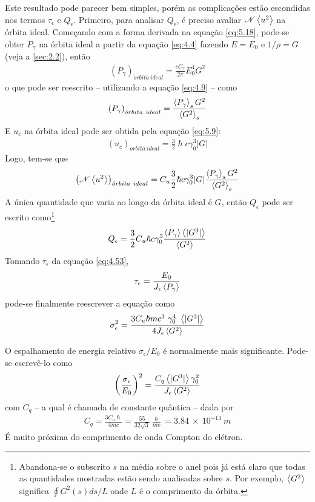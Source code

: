 Este resultado pode parecer bem simples, porém as complicações estão escondidas nos termos $\tau_\epsilon$ e $Q_\epsilon$. Primeiro, para analisar $Q_\epsilon$, é preciso avaliar $\mathscr{N}\left< u^2 \right>$ na órbita ideal. Começando com a forma derivada na equação \eqref{eq:5.18}, pode-se obter $P_\gamma$ na órbita ideal a partir da equação \eqref{eq:4.4} fazendo $E=E_0$ e $1/\rho = G$ (veja a \autoref{sec:2.2}), então
\begin{align}
	\left(P_\gamma\right)_{\acute{o}rbita\ ideal} = \frac{c C_\gamma}{2\pi}E_0^4G^2
\end{align}
o que pode ser reescrito -- utilizando a equação \eqref{eq:4.9} -- como
\begin{align}
	\left(P_\gamma\right)_{\acute{o}rbita\ ideal} = \frac{\left< P_\gamma \right>_s G^2}{\left< G^2 \right>_s}
\end{align}
E $u_c$ na órbita ideal pode ser obtida pela equação \eqref{eq:5.9}:
\begin{align}
	\left(u_c\right)_{\acute{o}rbita\ ideal} = \frac{3}{2}\hslash c \gamma_0^3 |G|\label{eq:5.40}
\end{align}
Logo, tem-se que
\begin{align}
	\left(\mathscr{N}\left< u^2 \right>\right)_{\acute{o}rbita\ ideal} = C_u \frac{3}{2}\hslash c \gamma_0^3 |G| \frac{\left< P_\gamma \right>_s G^2}{\left< G^2 \right>_s}
\end{align}
A única quantidade que varia ao longo da órbita ideal é $G$, então $Q_\epsilon$ pode ser escrito como\footnote{Abandona-se o subscrito $s$ na média sobre o anel pois já está claro que todas as quantidades mostradas estão sendo analisadas sobre $s$. Por exemplo, $\left< G^2 \right>$ significa $\oint G^2(s)ds/ L$ onde $L$ é o comprimento da órbita.}
\begin{align}
	Q_\epsilon = \frac{3}{2}C_u\hslash c \gamma_0^3 \frac{\left< P_\gamma \right> \left< |G^3| \right>}{\left< G^2 \right>}
\end{align}
Tomando $\tau_\epsilon$ da equação \eqref{eq:4.53},
\begin{align}
	\tau_\epsilon = \frac{E_0}{J_\epsilon\left< P_\gamma \right>}
\end{align}
pode-se finalmente reescrever a equação como
\begin{align}
	\sigma_\epsilon^2 = \frac{3 C_u \hslash m c^3\ \gamma_0^4\ \mean{|G^3|}}{4 J_\epsilon \mean{G^2}}
\end{align}

O espalhamento de energia relativo $\sigma_\epsilon/E_0$ é normalmente mais significante. Pode-se escrevê-lo como
\begin{align}
	\left(\frac{\sigma_\epsilon}{E_0}\right)^2 = \frac{C_q \left< |G^3| \right> \gamma_0^2}{J_\epsilon \left< G^2 \right>}\label{eq:5.45}
\end{align}
com $C_q$ -- a qual é chamada de constante quântica -- dada por
\begin{align}
	C_q = \frac{3C_u\hslash}{4mc} = \frac{55}{32\sqrt{3}}\frac{\hslash}{mc} = 3.84\ \times\ 10^{-13}\ m
\end{align}
É muito próxima do comprimento de onda Compton do elétron.

